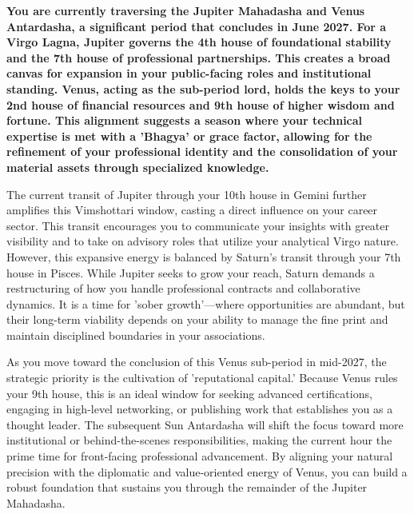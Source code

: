 
\label{topic55}

{\fontsize{9.5}{13.8}\selectfont\bfseries\color{DeepSlate} You are currently traversing the Jupiter Mahadasha and Venus Antardasha, a significant period that concludes in June 2027. For a Virgo Lagna, Jupiter governs the 4th house of foundational stability and the 7th house of professional partnerships. This creates a broad canvas for expansion in your public-facing roles and institutional standing. Venus, acting as the sub-period lord, holds the keys to your 2nd house of financial resources and 9th house of higher wisdom and fortune. This alignment suggests a season where your technical expertise is met with a 'Bhagya' or grace factor, allowing for the refinement of your professional identity and the consolidation of your material assets through specialized knowledge.}\par\vspace{2mm}

{\fontsize{9}{13}\selectfont The current transit of Jupiter through your 10th house in Gemini further amplifies this Vimshottari window, casting a direct influence on your career sector. This transit encourages you to communicate your insights with greater visibility and to take on advisory roles that utilize your analytical Virgo nature. However, this expansive energy is balanced by Saturn's transit through your 7th house in Pisces. While Jupiter seeks to grow your reach, Saturn demands a restructuring of how you handle professional contracts and collaborative dynamics. It is a time for 'sober growth'---where opportunities are abundant, but their long-term viability depends on your ability to manage the fine print and maintain disciplined boundaries in your associations.}\par\vspace{1.8mm}

{\fontsize{9}{13}\selectfont As you move toward the conclusion of this Venus sub-period in mid-2027, the strategic priority is the cultivation of 'reputational capital.' Because Venus rules your 9th house, this is an ideal window for seeking advanced certifications, engaging in high-level networking, or publishing work that establishes you as a thought leader. The subsequent Sun Antardasha will shift the focus toward more institutional or behind-the-scenes responsibilities, making the current hour the prime time for front-facing professional advancement. By aligning your natural precision with the diplomatic and value-oriented energy of Venus, you can build a robust foundation that sustains you through the remainder of the Jupiter Mahadasha.}\par\vspace{1.8mm}

